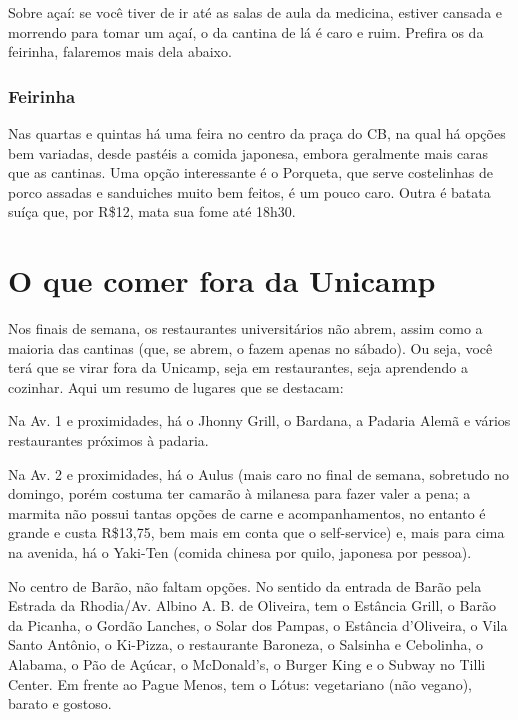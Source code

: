 Sobre açaí: se você tiver de ir até as salas de aula da medicina, estiver
cansada e morrendo para tomar um açaí, o da cantina de lá é caro e ruim.
Prefira os da feirinha, falaremos mais dela abaixo.

\subsubsection{Feirinha}

Nas quartas e quintas há uma feira no centro da praça do CB, na qual há opções
bem variadas, desde pastéis a comida japonesa, embora geralmente mais caras que
as cantinas. Uma opção interessante é o Porqueta, que serve costelinhas de
porco assadas e sanduiches muito bem feitos, é um pouco caro. Outra é batata suíça que, por R\$12, mata sua fome até 18h30.

\section{O que comer fora da Unicamp}

Nos finais de semana, os restaurantes universitários não abrem, assim como a
maioria das cantinas (que, se abrem, o fazem apenas no sábado). Ou seja, você
terá que se virar fora da Unicamp, seja em restaurantes, seja aprendendo a
cozinhar. Aqui um resumo de lugares que se destacam:

Na Av. 1 e proximidades, há o Jhonny Grill, o Bardana, a Padaria Alemã e vários
restaurantes próximos à padaria.

Na Av. 2 e proximidades, há o Aulus (mais caro no final de semana, sobretudo no
domingo, porém costuma ter camarão à milanesa para fazer valer a pena; a
marmita não possui tantas opções de carne e acompanhamentos, no entanto é
grande e custa R\$13,75, bem mais em conta que o self-service) e, mais para
cima na avenida, há o Yaki-Ten (comida chinesa por quilo, japonesa por pessoa).

No centro de Barão, não faltam opções. No sentido da entrada de Barão pela
Estrada da Rhodia/Av. Albino A. B. de Oliveira, tem o Estância Grill, o Barão
da Picanha, o Gordão Lanches, o Solar dos Pampas, o Estância d'Oliveira, o Vila
Santo Antônio, o Ki-Pizza, o restaurante Baroneza, o Salsinha e Cebolinha, o
Alabama, o Pão de Açúcar, o McDonald's, o Burger King e o Subway no Tilli
Center. Em frente ao Pague Menos, tem o Lótus: vegetariano (não vegano), barato
e gostoso.

